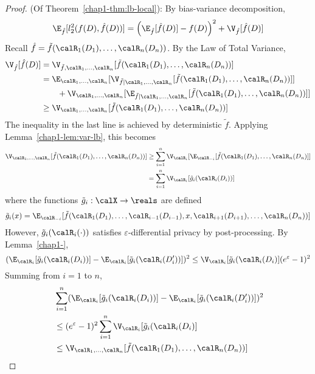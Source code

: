 \begin{proof}
  (Of Theorem~\ref{chap1-thm:lb-local}):
  By bias-variance decomposition,
  \begin{equation}
    \label{chap1-eq:bias-var-lb}
    \E_{\hat{f}}[l_2^2(f(D), \hat{f}(D))] = \left(\E_{\hat{f}}[\hat{f}(D)] -
    f(D)\right)^2 + \V_{\hat{f}}[\hat{f}(D)]
  \end{equation}
  Recall $\hat{f} = \tilde{f}(\calR_1(D_1),\ldots, \calR_n(D_n))$.
  By the Law of Total Variance,
  \begin{align*}
    \V_{\hat{f}}[\hat{f}(D)] &= \V_{\tilde{f},
      \calR_1,\ldots,\calR_n}[\tilde{f}(\calR_1(D_1),\ldots,\calR_n(D_n))] \\
      &=
      \E_{\calR_1,\ldots,\calR_n}[\V_{\tilde{f}\mid \calR_1,\ldots,\calR_n}
      [\tilde{f}(\calR_1(D_1),\ldots,\calR_n(D_n))]]
      \\
      &\qquad + \V_{\calR_1,\ldots,\calR_n}[\E_{\tilde{f}\mid \calR_1,\ldots,\calR_n}
      [\tilde{f}(\calR_1(D_1),\ldots,\calR_n(D_n))]] \\
      &\geq \V_{\calR_1,\ldots,\calR_n}[\tilde{f}(\calR_1(D_1),\ldots,
      \calR_n(D_n))]
  \end{align*}
  The inequality in the last line is achieved by deterministic $\tilde{f}$.
  Applying Lemma~\ref{chap1-lem:var-lb}, this becomes
  \begin{align*}
    \V_{\calR_1,\ldots,\calR_n}[\tilde{f}(\calR_1(D_1),\ldots,\calR_n(D_n))] 
    &\geq \sum_{i=1}^n
    \V_{\calR_i}[\E_{\calR_{-i}}[\tilde{f}(\calR_1(D_1),\ldots,\calR_n(D_n)]] \\
      &= \sum_{i=1}^n \V_{\calR_i}[\tilde{g}_i(\calR_i(D_i))]
  \end{align*}
  where the functions $\tilde{g}_i : \calX \rightarrow \reals$ are defined
  \[
    \tilde{g}_i(x) = \E_{\calR_{-i}}[\tilde{f}(\calR_1(D_1),\ldots,
    \calR_{i-1}(D_{i-1}),x,\calR_{i+1}(D_{i+1}),\ldots, \calR_n(D_n))]
  \]
  However, $\tilde{g}_i(\calR_{i}(\cdot))$ satisfies $\varepsilon$-differential
  privacy by post-processing.
  By Lemma~\ref{chap1-},
  \[
    ( \E_{\calR_i}[\tilde{g}_i(\calR_{i}(D_i))] -
    \E_{\calR_i}[\tilde{g}_i(\calR_{i}(D_i'))] )^2
    \leq \V_{\calR_i}[\tilde{g}_i(\calR_{i}(D_i)](e^\varepsilon-1)^2
  \]
  Summing from $i=1$ to $n$,
  \begin{align*}
    &\:\sum_{i=1}^n (\E_{\calR_i}[\tilde{g}_i(\calR_i(D_i))] - 
                  \E_{\calR_i}[\tilde{g}_i(\calR_i(D_i'))])^2 \\
    &\:\leq (e^\varepsilon-1)^2\sum_{i=1}^n
    \V_{\calR_i}[\tilde{g}_i(\calR_{i}(D_i)] \\
      &\:\leq \V_{\calR_1,\ldots,\calR_n}[\tilde{f}(\calR_1(D_1),\ldots,
      \calR_n(D_n))]
  \end{align*}


\end{proof}
